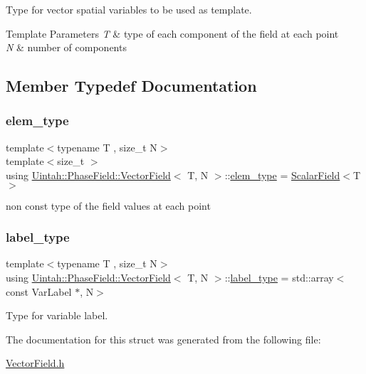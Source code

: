 Type for vector spatial variables to be used as template. 


\begin{DoxyTemplParams}{Template Parameters}
{\em T} & type of each component of the field at each point \\
\hline
{\em N} & number of components \\
\hline
\end{DoxyTemplParams}


\subsection{Member Typedef Documentation}
\mbox{\label{structUintah_1_1PhaseField_1_1VectorField_a4e64ec7a73cce3cb5864b927820e49cf}} 
\subsubsection{\texorpdfstring{elem\+\_\+type}{elem\_type}}
{\footnotesize\ttfamily template$<$typename T , size\+\_\+t N$>$ \\
template$<$size\+\_\+t $>$ \\
using \hyperlink{structUintah_1_1PhaseField_1_1VectorField}{Uintah\+::\+Phase\+Field\+::\+Vector\+Field}$<$ T, N $>$\+::\hyperlink{structUintah_1_1PhaseField_1_1VectorField_a4e64ec7a73cce3cb5864b927820e49cf}{elem\+\_\+type} =  \hyperlink{structUintah_1_1PhaseField_1_1ScalarField}{Scalar\+Field}$<$T$>$}



non const type of the field values at each point 

\mbox{\label{structUintah_1_1PhaseField_1_1VectorField_a59698346336d8cdfdf767367839f2be9}} 
\subsubsection{\texorpdfstring{label\+\_\+type}{label\_type}}
{\footnotesize\ttfamily template$<$typename T , size\+\_\+t N$>$ \\
using \hyperlink{structUintah_1_1PhaseField_1_1VectorField}{Uintah\+::\+Phase\+Field\+::\+Vector\+Field}$<$ T, N $>$\+::\hyperlink{structUintah_1_1PhaseField_1_1VectorField_a59698346336d8cdfdf767367839f2be9}{label\+\_\+type} =  std\+::array$<$const Var\+Label $\ast$, N$>$}



Type for variable label. 



The documentation for this struct was generated from the following file\+:\begin{DoxyCompactItemize}
\item 
\hyperlink{VectorField_8h}{Vector\+Field.\+h}\end{DoxyCompactItemize}
